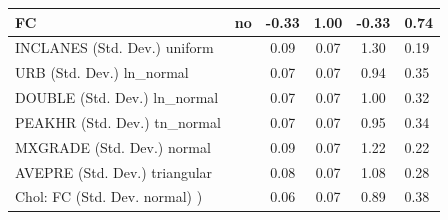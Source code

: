 \begin{table}
\begin{center}
\begin{tabular}{|l|l|c|c|c|l|}
			\hline
			FC & no & -0.33 & 1.00 & -0.33 & 0.74 \\
			\hline
			INCLANES (Std. Dev.) uniform &  & 0.09 & 0.07 & 1.30 & 0.19 \\
			\hline
			URB (Std. Dev.) ln_normal &  & 0.07 & 0.07 & 0.94 & 0.35 \\
			\hline
			DOUBLE (Std. Dev.) ln_normal &  & 0.07 & 0.07 & 1.00 & 0.32 \\
			\hline
			PEAKHR (Std. Dev.) tn_normal &  & 0.07 & 0.07 & 0.95 & 0.34 \\
			\hline
			MXGRADE (Std. Dev.) normal &  & 0.09 & 0.07 & 1.22 & 0.22 \\
			\hline
			AVEPRE (Std. Dev.) triangular &  & 0.08 & 0.07 & 1.08 & 0.28 \\
			\hline
			 Chol: FC (Std. Dev. normal) ) &  & 0.06 & 0.07 & 0.89 & 0.38 \\
			\hline
		\end{tabular}
	\end{center}
\end{table}